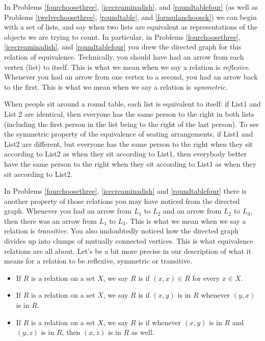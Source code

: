 In Problems \ref{fourchoosethree}, \ref{icecreaminadish}, and
\ref{roundtablefour} (as well as Problems
\ref{twelvechoosethree}, \ref{roundtable}, and
\ref{formulanchoosek}) we can begin with a
set of lists, and say when two lists are equivalent as
representations of the objects we are trying to count.  In
particular, in Problems
\ref{fourchoosethree}, \ref{icecreaminadish}, and
\ref{roundtablefour} you drew the directed graph for this
relation of equivalence.  Technically, you should have had an
arrow from each vertex (list) to itself.  This is what we mean
when we say a relation is {\em reflexive}.  Whenever you had an
arrow from one vertex to a second, you had an arrow back to the
first.  This is what we mean when we say a relation is {\em
symmetric}.    

When people sit
around a round table, each list is equivalent to itself:
if List1 and List 2 are identical, then everyone has the same
person to the right in both lists (including the first person in
the list being to the right of the last person).  To see the
symmetric property of the equivalence of seating arrangements, if
List1 and List2 are different, but everyone has the same person to
the right when they sit according to List2 as when they sit
according to List1, then everybody better have the same person to
the right when they sit according to List1 as when they sit
according to List2.  



 In Problems
\ref{fourchoosethree}, \ref{icecreaminadish} and
\ref{roundtablefour} there is another property of those relations
you may have noticed from the directed graph.  Whenever you had
an arrow from
$L_1$ to
$L_2$ and an arrow from
$L_2$ to $L_3$, then there was an arrow from $L_1$ to $L_3$. 
This is what we mean when we say a relation is {\em
transitive}.  You also undoubtedly noticed how the directed
graph divides up into clumps of mutually connected vertices. 
This is what equivalence relations are all about.  Let's be a
bit more precise in our description of what it means for a
relation to be reflexive, symmetric or transitive.  

\begin{itemize} 
\item If $R$ is a relation on a set $X$, we say $R$ is
  if $(x,x)\in
R$ for every
$x\in X$.  
\item If $R$ is a relation on a set $X$, we say $R$ is
 if $(x,y)$ is
in
$R$ whenever
$(y,x)$ is in $R$.
\item If $R$ is a relation on a set $X$, we say $R$ is
 if
whenever
$(x,y)$ is in
$R$ and
$(y,z)$ is in
$R$, then $(x,z)$ is in
$R$ as well.
\end{itemize}

